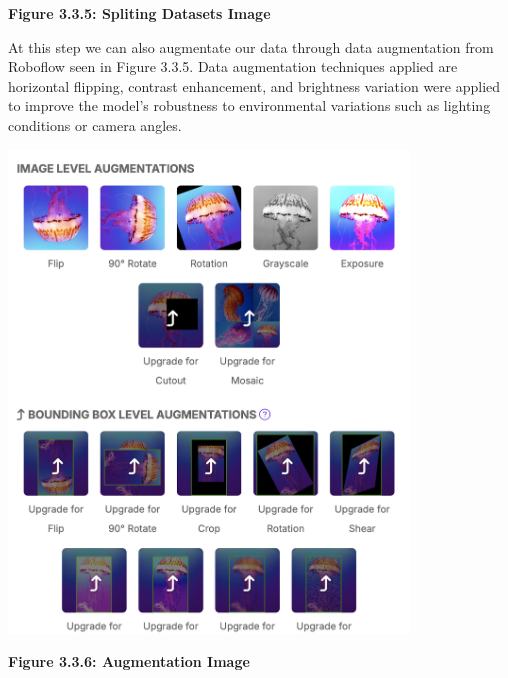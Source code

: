 \begin{itemize}
\begin{center}
		\vspace{0.5em}
		\textbf{Figure 3.3.5: Spliting Datasets Image}
	\end{center}
	At this step we can also augmentate our data through data augmentation from Roboflow seen in Figure 3.3.5. Data augmentation techniques applied are horizontal flipping, contrast enhancement, and brightness variation were applied to improve the model’s robustness to environmental variations such as lighting conditions or camera angles.
			\begin{center}
		\includegraphics[width=0.8\textwidth]{Augmentation.png}
		
		\vspace{0.5em}
		\textbf{Figure 3.3.6: Augmentation Image}
	\end{center}
	

\end{itemize}
